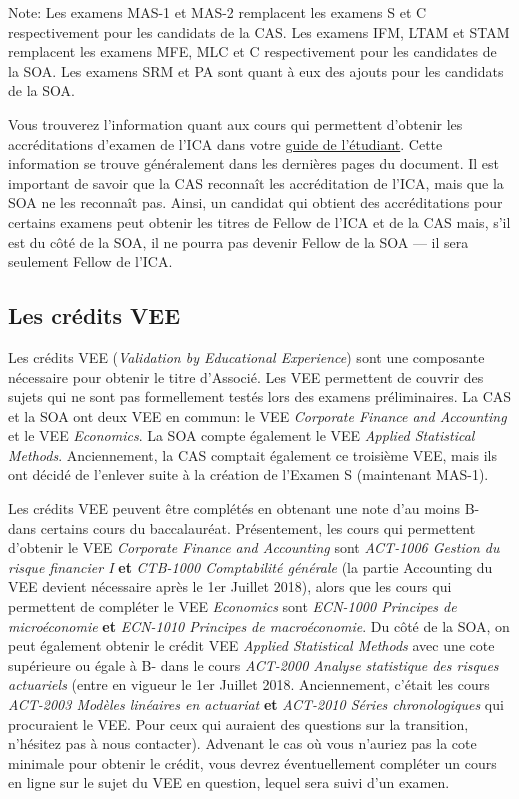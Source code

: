 Note: Les examens MAS-1 et MAS-2 remplacent les examens S et C respectivement pour les candidats de la CAS. Les examens IFM, LTAM et STAM remplacent les examens MFE, MLC et C respectivement pour les candidates de la SOA. Les examens SRM et PA sont quant à eux des ajouts pour les candidats de la SOA.\vspace{\baselineskip}

Vous trouverez l'information quant aux cours qui permettent d'obtenir les accréditations d'examen de l'ICA dans votre \href{https://www.act.ulaval.ca/programmes-et-cours/premier-cycle/guide-de-letudiant/}{guide de l'étudiant}. Cette information se trouve généralement dans les dernières pages du document. Il est important de savoir que la CAS reconnaît les accréditation de l'ICA, mais que la SOA ne les reconnaît pas. Ainsi, un candidat qui obtient des accréditations pour certains examens peut obtenir les titres de Fellow de l'ICA et de la CAS mais, s'il est du côté de la SOA, il ne pourra pas devenir Fellow de la SOA --- il sera seulement Fellow de l'ICA.

\subsection*{Les crédits VEE}
\label{subsec:vee}
Les crédits VEE (\emph{Validation by Educational Experience}) sont une composante nécessaire pour obtenir le titre d'Associé. Les VEE permettent de couvrir des sujets qui ne sont pas formellement testés lors des examens préliminaires. La CAS et la SOA ont deux VEE en commun: le VEE \emph{Corporate Finance and Accounting} et le VEE \emph{Economics}. La SOA compte également le VEE \emph{Applied Statistical Methods}. Anciennement, la CAS comptait également ce troisième VEE, mais ils ont décidé de l'enlever suite à la création de l'Examen S (maintenant MAS-1).\vspace{\baselineskip}

Les crédits VEE peuvent être complétés en obtenant une note d'au moins B- dans certains cours du baccalauréat. Présentement, les cours qui permettent d'obtenir le VEE \emph{Corporate Finance and Accounting} sont \textit{ACT-1006 Gestion du risque financier I} \textbf{et} \textit{CTB-1000 Comptabilité générale} (la partie Accounting du VEE devient nécessaire après le 1er Juillet 2018), alors que les cours qui permettent de compléter le VEE \emph{Economics} sont \textit{ECN-1000 Principes de microéconomie} \textbf{et} \textit{ECN-1010 Principes de macroéconomie}. Du côté de la SOA, on peut également obtenir le crédit VEE \emph{Applied Statistical Methods} avec une cote supérieure ou égale à B- dans le cours \textit{ACT-2000 Analyse statistique des risques actuariels} (entre en vigueur le 1er Juillet 2018. Anciennement, c'était les cours \textit{ACT-2003 Modèles linéaires en actuariat} \textbf{et} \textit{ACT-2010 Séries chronologiques} qui procuraient le VEE. Pour ceux qui auraient des questions sur la transition, n'hésitez pas à nous contacter). Advenant le cas où vous n'auriez pas la cote minimale pour obtenir le crédit, vous devrez éventuellement compléter un cours en ligne sur le sujet du VEE en question, lequel sera suivi d'un examen.

